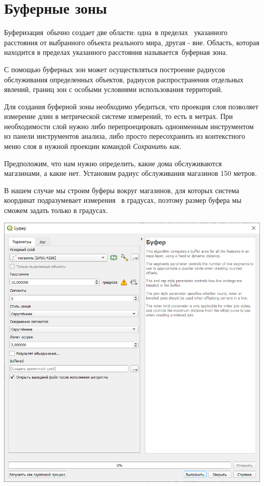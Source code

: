 \documentclass[
]{book}
\begin{document}
\hypertarget{ux431ux443ux444ux435ux440ux43dux44bux435-ux437ux43eux43dux44b}{%
\section{Буферные зоны}\label{ux431ux443ux444ux435ux440ux43dux44bux435-ux437ux43eux43dux44b}}

Буферизация~обычно создает две области: одна~в пределах~ указанного расстояния от выбранного объекта реального мира, другая - вне. Область, которая находится в пределах указанного расстояния называется~буферная зона.

С помощью буферных зон может осуществляться построение радиусов обслуживания определенных объектов, радиусов распространения отдельных явлений, границ зон с особыми условиями использования территорий.

Для создания буферной зоны необходимо убедиться, что проекция слоя позволяет измерение длин в метрической системе измерений, то есть в метрах. При необходимости слой нужно либо перепроецировать одноименным инструментом из панели инструментов анализа, либо просто пересохранить из контекстного меню слоя в нужной проекции командой \emph{Сохранить как}.

Предположим, что нам нужно определить, какие дома обслуживаются магазинами, а какие нет. Установим радиус обслуживания магазинов 150 метров.

В нашем случае мы строим буферы вокруг магазинов, для которых система координат подразумевает измерения ~в градусах, поэтому размер буфера мы сможем задать только в градусах.

\includegraphics{figures/44.png}
\end{document}

